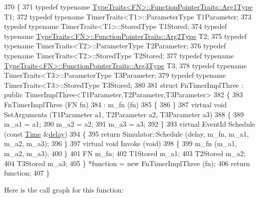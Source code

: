 \begin{DoxyCode}
370 \{
371   \textcolor{keyword}{typedef} \textcolor{keyword}{typename} \hyperlink{structTypeTraits}{TypeTraits<FN>::FunctionPointerTraits::Arg1Type}
       T1;
372   \textcolor{keyword}{typedef} \textcolor{keyword}{typename} TimerTraits<T1>::ParameterType T1Parameter;
373   \textcolor{keyword}{typedef} \textcolor{keyword}{typename} TimerTraits<T1>::StoredType T1Stored;
374   \textcolor{keyword}{typedef} \textcolor{keyword}{typename} \hyperlink{structTypeTraits}{TypeTraits<FN>::FunctionPointerTraits::Arg2Type}
       T2;
375   \textcolor{keyword}{typedef} \textcolor{keyword}{typename} TimerTraits<T2>::ParameterType T2Parameter;
376   \textcolor{keyword}{typedef} \textcolor{keyword}{typename} TimerTraits<T2>::StoredType T2Stored;
377   \textcolor{keyword}{typedef} \textcolor{keyword}{typename} \hyperlink{structTypeTraits}{TypeTraits<FN>::FunctionPointerTraits::Arg3Type}
       T3;
378   \textcolor{keyword}{typedef} \textcolor{keyword}{typename} TimerTraits<T3>::ParameterType T3Parameter;
379   \textcolor{keyword}{typedef} \textcolor{keyword}{typename} TimerTraits<T3>::StoredType T3Stored;
380 
381   \textcolor{keyword}{struct }FnTimerImplThree : \textcolor{keyword}{public} TimerImplThree<T1Parameter,T2Parameter,T3Parameter>
382   \{
383     FnTimerImplThree (FN fn)
384       : m\_fn (fn)
385     \{
386     \}
387     \textcolor{keyword}{virtual} \textcolor{keywordtype}{void} SetArguments (T1Parameter a1, T2Parameter a2, T3Parameter a3)
388     \{
389       m\_a1 = a1;
390       m\_a2 = a2;
391       m\_a3 = a3;
392     \}
393     \textcolor{keyword}{virtual} EventId Schedule (\textcolor{keyword}{const} \hyperlink{namespacens3_1_1TracedValueCallback_a7ffd3e7c142ffe7c8a1d2db9b8de38ec}{Time} &\hyperlink{lte_2model_2fading-traces_2fading__trace__generator_8m_a7964e6aa8f61a9d28973c8267a606ad8}{delay})
394     \{
395       \textcolor{keywordflow}{return} Simulator::Schedule (delay, m\_fn, m\_a1, m\_a2, m\_a3);
396     \}
397     \textcolor{keyword}{virtual} \textcolor{keywordtype}{void} Invoke (\textcolor{keywordtype}{void})
398     \{
399       m\_fn (m\_a1, m\_a2, m\_a3);
400     \}
401     FN m\_fn;
402     T1Stored m\_a1;
403     T2Stored m\_a2;
404     T3Stored m\_a3;
405   \} *\textcolor{keyword}{function} = \textcolor{keyword}{new} FnTimerImplThree (fn);
406   \textcolor{keywordflow}{return} \textcolor{keyword}{function};
407 \}
\end{DoxyCode}


Here is the call graph for this function\+:


